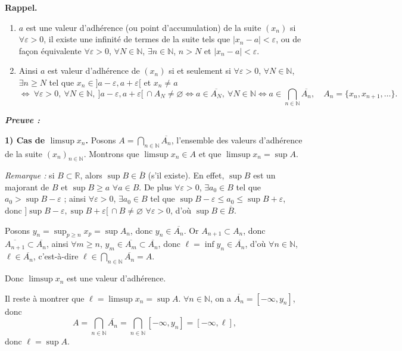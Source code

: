 \documentclass[11pt,a4paper]{article}
\newcommand{\R}{\mathbb{R}}
\newcommand{\N}{\mathbb{N}}
\newenvironment{preuve}{\par\textit{\textbf{Preuve :}}\par\nopagebreak[4]}{\par}
\begin{document}
\textbf{\color{bleu}Rappel.}
\begin{enumerate}[label=\textbf{\arabic*)},leftmargin=1.2cm]
  \item $a$ est une valeur d'adhérence (ou point d'accumulation) de la suite $(x_n)$ si
  $\forall\varepsilon>0$, il existe une infinité de termes de la suite tels que $|x_n-a|<\varepsilon$, ou de façon équivalente
  $\forall\varepsilon>0$, $\forall N\in\N$, $\exists n\in\N$, $n>N$ et $|x_n-a|<\varepsilon$.
  \item Ainsi $a$ est valeur d'adhérence de $(x_n)$ si et seulement si $\forall\varepsilon>0$, $\forall N\in\N$, $\exists n\ge N$ tel que
  $x_n\in]a-\varepsilon,a+\varepsilon[$ et $x_n\neq a$
  \[
    \iff\ \forall\varepsilon>0,\ \forall N\in\N,\ ]a-\varepsilon,a+\varepsilon[\,\cap A_N\neq\varnothing
    \iff a\in\overline{A_N},\ \forall N\in\N
    \iff a\in\bigcap_{n\in\N}\overline{A_n},\quad A_n=\{x_n,x_{n+1},\dots\}.
  \]
\end{enumerate}

\begin{preuve}\end{preuve}
\textbf{1) Cas de $\limsup x_n$.} Posons $A=\bigcap_{n\in\N}\overline{A_n}$, l'ensemble des valeurs d'adhérence de la suite $(x_n)_{n\in\N}$.
Montrons que $\limsup x_n\in A$ et que $\limsup x_n=\sup A$.

\emph{Remarque :} si $B\subset\R$, alors $\sup B\in\overline B$ (s'il existe). En effet, $\sup B$ est un majorant de $B$ et $\sup B\ge a$ $\forall a\in B$.
De plus $\forall\varepsilon>0$, $\exists a_0\in B$ tel que $a_0>\sup B-\varepsilon$ ; ainsi $\forall\varepsilon>0$, $\exists a_0\in B$ tel que
$\sup B-\varepsilon\le a_0\le\sup B+\varepsilon$, donc $]\sup B-\varepsilon,\sup B+\varepsilon[\,\cap B\neq\varnothing$ $\forall\varepsilon>0$, d'où $\sup B\in\overline B$.

Posons $y_n=\sup_{p\ge n}x_p=\sup A_n$, donc $y_n\in\overline{A_n}$. Or $A_{n+1}\subset A_n$, donc $\overline{A_{n+1}}\subset\overline{A_n}$, ainsi
$\forall m\ge n$, $y_m\in\overline{A_m}\subset\overline{A_n}$, donc $\ell=\inf y_n\in\overline{A_n}$, d'où $\forall n\in\N$, $\ell\in\overline{A_n}$,
c'est-à-dire $\ell\in\bigcap_{n\in\N}\overline{A_n}=A$.

Donc $\limsup x_n$ est une valeur d'adhérence.

Il reste à montrer que $\ell=\limsup x_n=\sup A$. $\forall n\in\N$, on a $\overline{A_n}=[-\infty,y_n]$, donc
\[
  A=\bigcap_{n\in\N}\overline{A_n}=\bigcap_{n\in\N}[-\infty,y_n]=[-\infty,\ell],
\]
donc $\ell=\sup A$.
\end{document}

